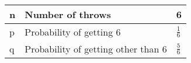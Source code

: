 \begin{tabular}{|l|l|l|}\hline
n	&Number of throws	&6\\\hline
p	&Probability of getting 6	&$\frac{1}{6}$\\\hline
q	&Probability of getting other than 6	&$\frac{5}{6}$\\\hline
\end{tabular}

